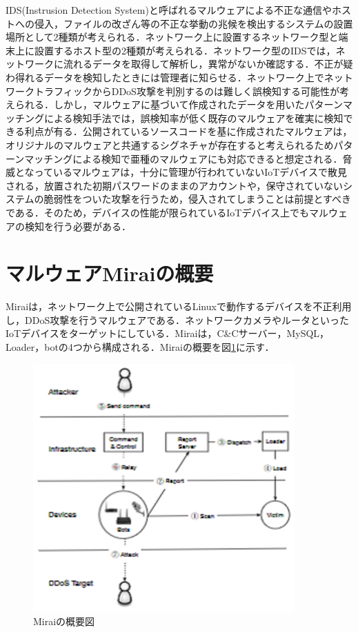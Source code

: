 IDS(Instrusion Detection System)と呼ばれるマルウェアによる不正な通信やホストへの侵入，ファイルの改ざん等の不正な挙動の兆候を検出するシステムの設置場所として2種類が考えられる．ネットワーク上に設置するネットワーク型と端末上に設置するホスト型の2種類が考えられる．ネットワーク型のIDSでは，ネットワークに流れるデータを取得して解析し，異常がないか確認する．不正が疑わ得れるデータを検知したときには管理者に知らせる．ネットワーク上でネットワークトラフィックからDDoS攻撃を判別するのは難しく誤検知する可能性が考えられる．しかし，マルウェアに基づいて作成されたデータを用いたパターンマッチングによる検知手法では，誤検知率が低く既存のマルウェアを確実に検知できる利点が有る．公開されているソースコードを基に作成されたマルウェアは，オリジナルのマルウェアと共通するシグネチャが存在すると考えられるためパターンマッチングによる検知で亜種のマルウェアにも対応できると想定される．脅威となっているマルウェアは，十分に管理が行われていないIoTデバイスで散見される，放置された初期パスワードのままのアカウントや，保守されていないシステムの脆弱性をついた攻撃を行うため，侵入されてしまうことは前提とすべきである．そのため，デバイスの性能が限られているIoTデバイス上でもマルウェアの検知を行う必要がある．

\section{マルウェアMiraiの概要}

Miraiは，ネットワーク上で公開されているLinuxで動作するデバイスを不正利用し，DDoS攻撃を行うマルウェアである．ネットワークカメラやルータといったIoTデバイスをターゲットにしている．Miraiは，C\&Cサーバー，MySQL，Loader，botの4つから構成される．Miraiの概要を図\ref{fig:Mirai_system}に示す．

\begin{figure}[h]
   \centering
      \includegraphics[width=100mm]{figures/s.eps}
      \caption{Miraiの概要図}
   \label{fig:Mirai_system}   
\end{figure}

